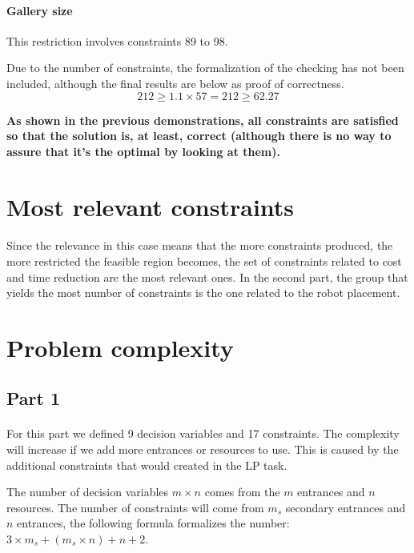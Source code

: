 \paragraph{Gallery size}
This restriction involves constraints 89 to 98.

Due to the number of constraints, the formalization of the checking has not been included, although the final results are below as proof of correctness.
\begin{equation}
    212 \geq 1.1 \times 57 = 212 \geq 62.27
\end{equation}

\textbf{As shown in the previous demonstrations, all constraints are satisfied so that the solution is, at least, correct (although there is no way to assure that it's the optimal by looking at them).}

\section{Most relevant constraints}

\paragraph{}
Since the relevance in this case means that the more constraints produced, the more restricted the feasible region becomes, the set of constraints related to cost and time reduction are the most relevant ones. In the second part, the group that yields the most number of constraints is the one related to the robot placement. 

\section{Problem complexity}

\subsection{Part 1}

\paragraph{}
For this part we defined 9 decision variables and 17 constraints.
The complexity will increase if we add more entrances or resources to use. This is caused by the additional constraints that would created in the LP task.

The number of decision variables $m \times n$ comes from the $m$ entrances and $n$ resources. The number of constraints will come from $m_s$ secondary entrances and $n$ entrances, the following formula formalizes the number: $3 \times m_s + (m_s \times n) + n + 2$.

